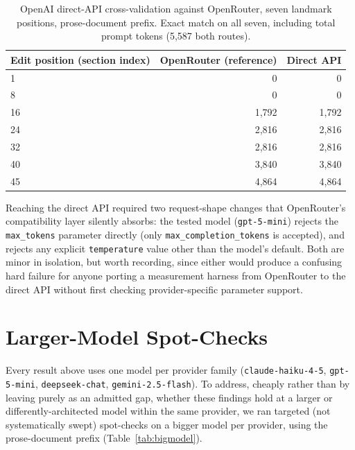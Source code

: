 \documentclass[11pt]{article}
\newcommand{\code}[1]{\texttt{#1}}
\begin{document}
\begin{table}[t]
\centering
\caption{OpenAI direct-API cross-validation against OpenRouter, seven
landmark positions, prose-document prefix. Exact match on all seven,
including total prompt tokens (5,587 both routes).}
\label{tab:crossval}
\begin{tabular}{@{}lrr@{}}
\toprule
Edit position (section index) & OpenRouter (reference) & Direct API \\
\midrule
1  & 0     & 0 \\
8  & 0     & 0 \\
16 & 1{,}792 & 1{,}792 \\
24 & 2{,}816 & 2{,}816 \\
32 & 2{,}816 & 2{,}816 \\
40 & 3{,}840 & 3{,}840 \\
45 & 4{,}864 & 4{,}864 \\
\bottomrule
\end{tabular}
\end{table}

Reaching the direct API required two request-shape changes that
OpenRouter's compatibility layer silently absorbs: the tested model
(\code{gpt-5-mini}) rejects the \code{max\_tokens} parameter directly
(only \code{max\_completion\_tokens} is accepted), and rejects any explicit
\code{temperature} value other than the model's default. Both are minor
in isolation, but worth recording, since either would produce a confusing
hard failure for anyone porting a measurement harness from OpenRouter to
the direct API without first checking provider-specific parameter support.

\section{Larger-Model Spot-Checks}
\label{sec:bigmodel}

Every result above uses one model per provider family
(\code{claude-haiku-4-5}, \code{gpt-5-mini}, \code{deepseek-chat},
\code{gemini-2.5-flash}). To address, cheaply rather than by leaving purely
as an admitted gap, whether these findings hold at a larger or
differently-architected model within the same provider, we ran targeted
(not systematically swept) spot-checks on a bigger model per provider,
using the prose-document prefix (Table~\ref{tab:bigmodel}).
\end{document}
